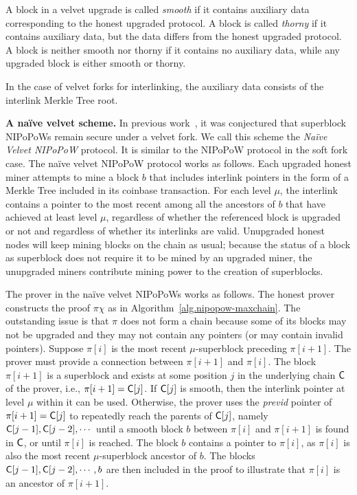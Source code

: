 \begin{definition}
A block in a velvet upgrade is called \emph{smooth} if it contains
auxiliary data corresponding to the honest upgraded protocol. A block
is called \emph{thorny} if it contains auxiliary data, but the data differs from
the honest upgraded protocol. A block is neither smooth nor thorny if it
contains no auxiliary data, while any upgraded block is either smooth or thorny.
\end{definition}

In the case of velvet forks for interlinking, the auxiliary data consists
of the interlink Merkle Tree root.

\noindent
\textbf{A na\"ive velvet scheme.}
In previous work~\cite{nipopows}, it was conjectured that superblock NIPoPoWs
remain secure under a velvet fork. We call this scheme the \emph{Na\"ive Velvet
NIPoPoW} protocol. It is similar to the NIPoPoW protocol in the
soft fork case. The na\"ive velvet NIPoPoW protocol works as follows.
Each upgraded honest miner attempts to mine a block $b$
that includes interlink pointers in the form of a Merkle Tree included in its
coinbase transaction. For each level $\mu$, the interlink contains a pointer to
the most recent among all the ancestors of $b$ that have achieved at least
level $\mu$, regardless of whether the referenced block is upgraded or not and
regardless of whether its interlinks are valid. Unupgraded honest nodes will
keep mining blocks on the chain as usual; because the status of a block as
superblock does not require it to be mined by an upgraded miner, the unupgraded
miners contribute mining power to the creation of superblocks.

The prover in the na\"ive velvet NIPoPoWs works as follows. The honest
prover constructs the proof $\pi \chi$ as in Algorithm~\ref{alg.nipopow-maxchain}.
The outstanding issue is that
$\pi$ does not form a chain because some of
its blocks may not be upgraded and they may not contain any pointers (or may
contain invalid pointers).
Suppose $\pi[i]$ is the most recent $\mu$-superblock preceding $\pi[i + 1]$.
The prover must provide a connection between $\pi[i + 1]$ and $\pi[i]$.
The block $\pi[i + 1]$ is a superblock and exists at some position $j$ in the
underlying chain $\mathsf{C}$ of the prover, i.e., $\pi[i + 1] = \mathsf{C}[j]$. If
$\mathsf{C}[j]$ is smooth, then the interlink pointer at level $\mu$ within
it can be used. Otherwise, the prover uses the \emph{previd} pointer of
$\pi[i + 1] = \mathsf{C}[j]$ to repeatedly reach the parents of $\mathsf{C}[j]$, namely
$\mathsf{C}[j - 1], \mathsf{C}[j - 2], \cdots$ until a smooth block $b$ between $\pi[i]$
and $\pi[i + 1]$ is found in $\mathsf{C}$, or until $\pi[i]$ is reached.
The block $b$ contains a pointer to
$\pi[i]$, as $\pi[i]$ is also the most recent $\mu$-superblock ancestor of $b$.
The blocks $\mathsf{C}[j - 1], \mathsf{C}[j - 2], \cdots, b$ are then included in the
proof to illustrate that $\pi[i]$ is an ancestor of $\pi[i + 1]$.

